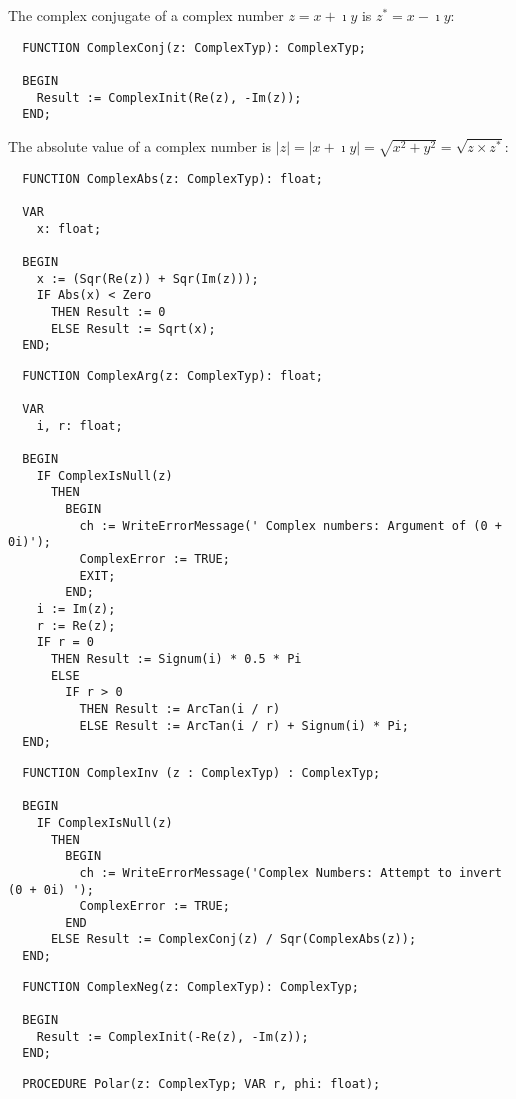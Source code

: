 \begin{refsection}
The complex conjugate of a complex number \(z = x + \imath y \) is \(z^* = x - \imath y \):

\begin{lstlisting}
  FUNCTION ComplexConj(z: ComplexTyp): ComplexTyp;

  BEGIN
    Result := ComplexInit(Re(z), -Im(z));
  END;
\end{lstlisting}

The absolute value of a complex number is \(|z| = |x + \imath y| = \sqrt{x^2 + y^2} = \sqrt{z \times z^*} \):

\begin{lstlisting}
  FUNCTION ComplexAbs(z: ComplexTyp): float;

  VAR
    x: float;

  BEGIN
    x := (Sqr(Re(z)) + Sqr(Im(z)));
    IF Abs(x) < Zero
      THEN Result := 0
      ELSE Result := Sqrt(x);
  END;
\end{lstlisting}


\begin{lstlisting}
  FUNCTION ComplexArg(z: ComplexTyp): float;

  VAR
    i, r: float;

  BEGIN
    IF ComplexIsNull(z)
      THEN
        BEGIN
          ch := WriteErrorMessage(' Complex numbers: Argument of (0 + 0i)');
          ComplexError := TRUE;
          EXIT;
        END;
    i := Im(z);
    r := Re(z);
    IF r = 0
      THEN Result := Signum(i) * 0.5 * Pi
      ELSE
        IF r > 0
          THEN Result := ArcTan(i / r)
          ELSE Result := ArcTan(i / r) + Signum(i) * Pi;
  END;
\end{lstlisting}

\begin{lstlisting}
  FUNCTION ComplexInv (z : ComplexTyp) : ComplexTyp;

  BEGIN
    IF ComplexIsNull(z)
      THEN
        BEGIN
          ch := WriteErrorMessage('Complex Numbers: Attempt to invert (0 + 0i) ');
          ComplexError := TRUE;
        END
      ELSE Result := ComplexConj(z) / Sqr(ComplexAbs(z));
  END;
\end{lstlisting}


\begin{lstlisting}
  FUNCTION ComplexNeg(z: ComplexTyp): ComplexTyp;

  BEGIN
    Result := ComplexInit(-Re(z), -Im(z));
  END;
\end{lstlisting}


\begin{lstlisting}
  PROCEDURE Polar(z: ComplexTyp; VAR r, phi: float);


\end{lstlisting}
\end{refsection}
